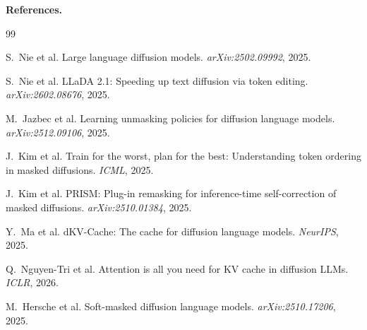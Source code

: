 \documentclass[10pt]{article}
\begin{document}
\textbf{References.}


\begin{thebibliography}{99}
\vspace{-27pt}

S.~Nie et al. Large language diffusion models. \emph{arXiv:2502.09992}, 2025.

S.~Nie et al. {LLaDA 2.1}: Speeding up text diffusion via token editing. \emph{arXiv:2602.08676}, 2025.

M.~Jazbec et al. Learning unmasking policies for diffusion language models. \emph{arXiv:2512.09106}, 2025.

J.~Kim et al. Train for the worst, plan for the best: Understanding token ordering in masked diffusions. \emph{ICML}, 2025.

J.~Kim et al. {PRISM}: Plug-in remasking for inference-time self-correction of masked diffusions. \emph{arXiv:2510.01384}, 2025.

Y.~Ma et al. {dKV-Cache}: The cache for diffusion language models. \emph{NeurIPS}, 2025.

Q.~Nguyen-Tri et al. Attention is all you need for KV cache in diffusion LLMs. \emph{ICLR}, 2026.

M.~Hersche et al. Soft-masked diffusion language models. \emph{arXiv:2510.17206}, 2025.
\end{thebibliography}
\end{document}

